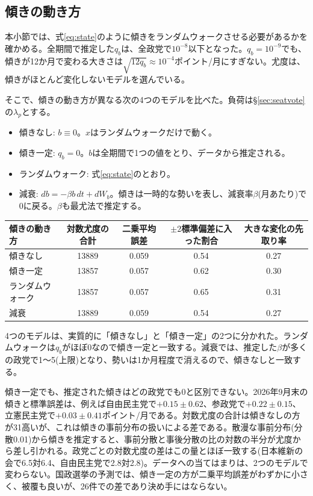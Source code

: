 \documentclass[a4paper,11pt]{ltjsarticle}
\begin{document}
\subsection{傾きの動き方}
\label{sec:slope}

本小節では、式\eqref{eq:state}のように傾きをランダムウォークさせる必要があるかを確かめる。全期間で推定した$q_b$は、全政党で$10^{-8}$以下となった。$q_b=10^{-9}$でも、傾きが12か月で変わる大きさは$\sqrt{12q_b}\approx10^{-4}$ポイント/月にすぎない。尤度は、傾きがほとんど変化しないモデルを選んでいる。

そこで、傾きの動き方が異なる次の4つのモデルを比べた。負荷は\S\ref{sec:seatvote}の$\lambda_p$とする。
\begin{itemize}
  \item 傾きなし: $b\equiv0$。$x$はランダムウォークだけで動く。
  \item 傾き一定: $q_b=0$。$b$は全期間で1つの値をとり、データから推定される。
  \item ランダムウォーク: 式\eqref{eq:state}のとおり。
  \item 減衰: $db=-\beta b\,dt+dW_b$。傾きは一時的な勢いを表し、減衰率$\beta$(月あたり)で0に戻る。$\beta$も最尤法で推定する。
\end{itemize}

\begin{table}[h]
\centering
\begin{tabular}{lcccc}
\hline
傾きの動き方 & 対数尤度の合計 & 二乗平均誤差 & $\pm2$標準偏差に入った割合 & 大きな変化の先取り率 \\
\hline
傾きなし & 13889 & 0.059 & 0.54 & 0.27 \\
傾き一定 & 13857 & 0.057 & 0.62 & 0.30 \\
ランダムウォーク & 13857 & 0.057 & 0.65 & 0.31 \\
減衰 & 13889 & 0.059 & 0.54 & 0.27 \\
\hline
\end{tabular}
\end{table}

4つのモデルは、実質的に「傾きなし」と「傾き一定」の2つに分かれた。ランダムウォークは$q_b$がほぼ0なので傾き一定と一致する。減衰では、推定した$\beta$が多くの政党で1〜5(上限)となり、勢いは1か月程度で消えるので、傾きなしと一致する。

傾き一定でも、推定された傾きはどの政党でも0と区別できない。2026年9月末の傾きと標準誤差は、例えば自由民主党で$+0.15\pm0.62$、参政党で$+0.22\pm0.15$、立憲民主党で$+0.03\pm0.41$ポイント/月である。対数尤度の合計は傾きなしの方が31高いが、これは傾きの事前分布の扱いによる差である。散漫な事前分布(分散0.01)から傾きを推定すると、事前分散と事後分散の比の対数の半分が尤度から差し引かれる。政党ごとの対数尤度の差はこの量とほぼ一致する(日本維新の会で6.5対6.4、自由民主党で2.8対2.8)。データへの当てはまりは、2つのモデルで変わらない。国政選挙の予測では、傾き一定の方が二乗平均誤差がわずかに小さく、被覆も良いが、26件での差であり決め手にはならない。
\end{document}
